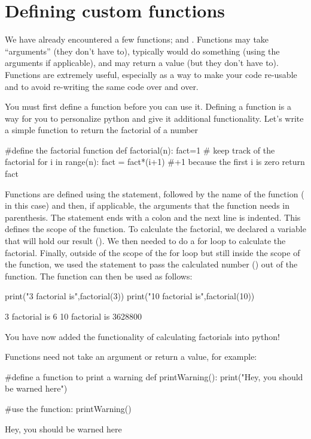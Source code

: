 \section{Defining custom functions}
We have already encountered a few functions;  and . Functions may take ``arguments'' (they don't have to), typically would do something (using the arguments if applicable), and may return a value (but they don't have to). Functions are extremely useful, especially as a way to make your code re-usable and to avoid re-writing the same code over and over. 

You must first define a function before you can use it. Defining a function is a way for you to personalize python and give it additional functionality. Let's write a simple function to return the factorial of a number
\begin{python}[caption = \mbox{}]
#define the factorial function
def factorial(n):
    fact=1 # keep track of the factorial
    for i in range(n):
        fact = fact*(i+1) #+1 because the first i is zero
    return fact
\end{python}
Functions are defined using the  statement, followed by the name of the function ( in this case) and then, if applicable, the arguments that the function needs in parenthesis. The statement ends with a colon and the next line is indented. This defines the scope of the function. To calculate the factorial, we declared a variable that will hold our result (). We then needed to do a for loop to calculate the factorial. Finally, outside of the scope of the for loop but still inside the scope of the function, we used the  statement to pass the calculated number () out of the function. The function can then be used as follows:
\begin{python}[caption = \mbox{}]
print("3 factorial is",factorial(3))
print("10 factorial is",factorial(10))
\end{python}
\begin{poutput}
3 factorial is 6
10 factorial is 3628800
\end{poutput}
You have now added the functionality of calculating factorials into python!

Functions need not take an argument or return a value, for example:
\begin{python}[caption = \mbox{}]
#define a function to print a warning
def printWarning():
  print("Hey, you should be warned here")

#use the function:
printWarning()
\end{python}
\begin{poutput}
Hey, you should be warned here
\end{poutput}

